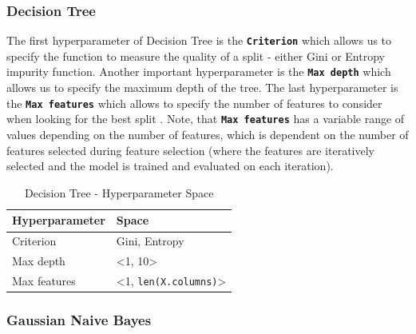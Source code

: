 \subsubsection{Decision Tree}
The first hyperparameter of Decision Tree is the \textbf{\texttt{Criterion}} which allows us to specify the function to measure the quality of a split - either Gini or Entropy impurity function.
Another important hyperparameter is the \textbf{\texttt{Max depth}} which allows us to specify the maximum depth of the tree.
The last hyperparameter is the \textbf{\texttt{Max features}} which allows to specify the number of features to consider when looking for the best split \citep{scikit-dt}.
Note, that \textbf{\texttt{Max features}} has a variable range of values depending on the number of features, which is dependent on the number of features selected during feature selection (where the features are iteratively selected and the model is trained and evaluated on each iteration).
\begin{table}[H]
\small
\setlength{\tabcolsep}{8pt}
\renewcommand{\arraystretch}{1.3}
\centering
    \caption[Decision Tree - Hyperparameter Space]{Decision Tree - Hyperparameter Space}\label{tab:dtspace}
    \begin{tabular}{ll}
\toprule
\textbf{Hyperparameter} & \textbf{Space}\\
\midrule
\hline
Criterion & Gini, Entropy \\
Max depth & <1, 10> \\
Max features & <1, \verb|len(X.columns)|>  \\
\hline
\bottomrule
\end{tabular}
\vspace{0.7em}

\vspace{-1em}
\end{table}

\newpage
\subsubsection{Gaussian Naive Bayes}

